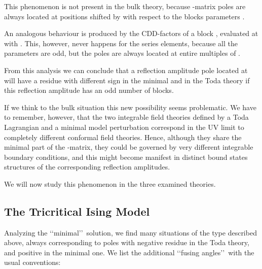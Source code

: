 \documentclass[a4paper,12pt]{report}
\begin{document}
This phenomenon is not present in the bulk theory, because \coordHE{}-matrix poles are always located at positions
shifted by \coordHE{} with respect to the blocks parameters \coordHE{}.

An analogous behaviour is produced by the CDD-factors of a block \coordHE{}, evaluated at
\coordHE{} with \coordHE{}. This, however, never happens for the \coordHE{} series
elements, because all the parameters \coordHE{} are odd, but the poles are always located at entire multiples of
\coordHE{}.

From this analysis we can conclude that a reflection amplitude pole located at \coordHE{}
will have a residue with different sign in the minimal and in the Toda theory if this reflection amplitude has an
odd number of \myHighlight{$\{\eta\}$}\coordHE{} blocks.

If we think to the bulk situation this new possibility seems problematic. We have to remember, however, that the
two integrable field theories defined by a Toda Lagrangian and a minimal model perturbation correspond in the UV
limit to completely different conformal field theories. Hence, although they share the minimal part of the
\coordHE{}-matrix, they could be governed by very different integrable boundary conditions, and this might become
manifest in distinct bound states structures of the corresponding reflection amplitudes.

We will now study this phenomenon in the three examined theories.



\subsection{The Tricritical Ising Model}

Analyzing the \lq\lq minimal\rq\rq \, solution, we find many situations of the type described above, always
corresponding to poles with negative residue in the Toda theory, and positive in the minimal one. We list the
additional \lq\lq fusing angles\rq\rq \, with the usual conventions:
\end{document}
